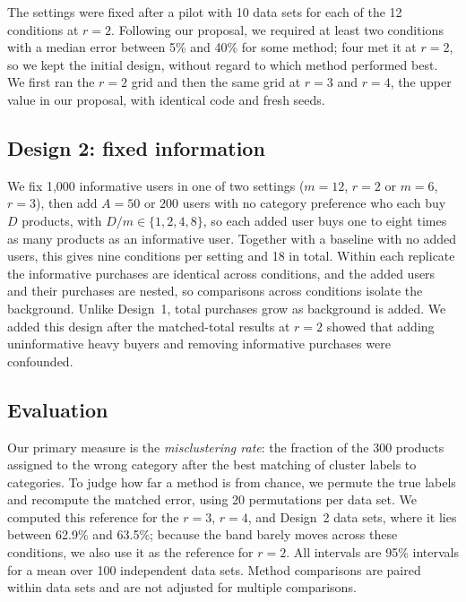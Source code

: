\documentclass[12pt]{article}
\begin{document}
The settings were fixed after a pilot with 10 data sets for each of the 12 conditions at $r=2$. Following our proposal, we required at least two conditions with a median error between 5\% and 40\% for some method; four met it at $r=2$, so we kept the initial design, without regard to which method performed best. We first ran the $r=2$ grid and then the same grid at $r=3$ and $r=4$, the upper value in our proposal, with identical code and fresh seeds.

\subsection{Design 2: fixed information}

We fix 1{,}000 informative users in one of two settings ($m=12$, $r=2$ or $m=6$, $r=3$), then add $A=50$ or $200$ users with no category preference who each buy $D$ products, with $D/m\in\{1,2,4,8\}$, so each added user buys one to eight times as many products as an informative user. Together with a baseline with no added users, this gives nine conditions per setting and 18 in total. Within each replicate the informative purchases are identical across conditions, and the added users and their purchases are nested, so comparisons across conditions isolate the background. Unlike Design~1, total purchases grow as background is added. We added this design after the matched-total results at $r=2$ showed that adding uninformative heavy buyers and removing informative purchases were confounded.

\subsection{Evaluation}

Our primary measure is the \emph{misclustering rate}: the fraction of the 300 products assigned to the wrong category after the best matching of cluster labels to categories. To judge how far a method is from chance, we permute the true labels and recompute the matched error, using 20 permutations per data set. We computed this reference for the $r=3$, $r=4$, and Design~2 data sets, where it lies between 62.9\% and 63.5\%; because the band barely moves across these conditions, we also use it as the reference for $r=2$. All intervals are 95\% intervals for a mean over 100 independent data sets. Method comparisons are paired within data sets and are not adjusted for multiple comparisons.

\end{document}
